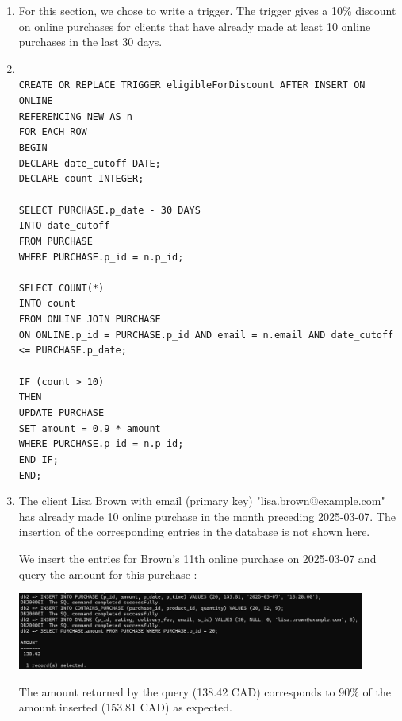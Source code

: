 \documentclass[a4paper,11pt]{article}
\begin{document}
\begin{enumerate}[label=\alph*)]

\item For this section, we chose to write a trigger. The trigger gives a 10\% discount on online purchases for 
clients that have already made at least 10 online purchases in the last 30 days.

\item \texttt{ \\
CREATE OR REPLACE TRIGGER eligibleForDiscount AFTER INSERT ON ONLINE\\
REFERENCING NEW AS n\\
FOR EACH ROW \\
BEGIN\\
    DECLARE date\_cutoff DATE;\\
    DECLARE count INTEGER;\\
    \\
    SELECT PURCHASE.p\_date - 30 DAYS\\
    INTO date\_cutoff\\
    FROM PURCHASE\\
    WHERE PURCHASE.p\_id = n.p\_id;\\
    \\
    SELECT COUNT(*) \\
    INTO count\\
    FROM ONLINE JOIN PURCHASE\\
    ON ONLINE.p\_id = PURCHASE.p\_id AND email = n.email AND date\_cutoff <= PURCHASE.p\_date;\\
    \\
    IF (count > 10)\\
    THEN\\
        UPDATE PURCHASE\\
        SET amount = 0.9 * amount\\
        WHERE PURCHASE.p\_id = n.p\_id;\\
    END IF;\\
END;
}

\item The client Lisa Brown with email (primary key) "lisa.brown@example.com" has already made 10 online purchase 
in the month preceding 2025-03-07. 
The insertion of the corresponding entries in the database is not shown here.

We insert the entries for Brown's 11th online purchase on 2025-03-07 and query the amount for this purchase :

\includegraphics[width=0.9\textwidth]{images/Trigger.png}

The amount returned by the query (138.42 CAD) corresponds to 90\% of the amount inserted (153.81 CAD) as expected.

\end{enumerate}
\end{document}
